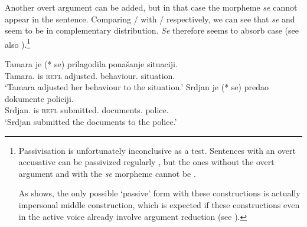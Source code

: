 \documentclass[output=paper,
modfonts,
newtxmath,
hidelinks
]{langscibook}
\begin{document}
\noindent Another overt \accc{} argument can be added, but in that case the morpheme \textit{se} cannot appear in the sentence. Comparing / with / respectively, we can see that \textit{se} and \accc{} seem to be in complementary distribution. \textit{Se} therefore seems to absorb \accc{} case (see also \citealt{franks95}).\footnote{Passivisation is unfortunately inconclusive as a test. Sentences with an overt accusative can be passivized regularly , but the ones without the overt \accc{} argument and with the \textit{se} morpheme cannot be .  
	
	\ea
	\label{fn7exia}
	\label{fn7exib}
	\label{fn7exic}
    \z \z

\noindent	As  shows, the only possible `passive' form with these constructions is actually impersonal middle construction, which is expected if these constructions even in the active voice already involve argument reduction (see \citealt{progovac13,marelj04}).}

\ea\label{structuraladjust}
\ea\label{ex30a}\gll Tamara je (*\hspace{-2pt} se) prilagodila ponašanje situaciji.\\
Tamara.\nomm{} is {} \textsc{refl} adjusted.\fsg{} behaviour.\accc{} situation.\datt\\
\glt `Tamara adjusted her behaviour to the situation.'
\ex\label{ex30b}\gll Srdjan je (*\hspace{-2pt} se) predao dokumente policiji.\\
Srdjan.\nomm{} is {} \textsc{refl} submitted.\msg{} documents.\accc{} police.\datt\\
\glt `Srdjan submitted the documents to the police.'
\z \z
\end{document}
